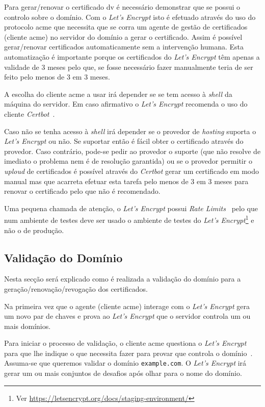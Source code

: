 Para gerar/renovar o certificado \acrshort{dv} é necessário demonstrar que se possui o controlo sobre o domínio. Com o \textit{Let's Encrypt} isto é efetuado através do uso do protocolo \acrfull{acme} que necessita que se corra um agente de gestão de certificados (cliente \acrshort{acme}) no servidor do domínio a gerar o certificado. Assim é possível gerar/renovar certificados automaticamente sem a intervenção humana. Esta automatização é importante porque os certificados do \textit{Let's Encrypt} têm apenas a validade de 3 meses pelo que, se fosse necessário fazer manualmente teria de ser feito pelo menos de 3 em 3 meses.

A escolha do cliente \acrshort{acme} a usar irá depender se se tem acesso à \textit{shell} da máquina do servidor. Em caso afirmativo o \textit{Let's Encrypt} recomenda o uso do cliente \textit{Certbot}~\cite{letEnc}.

Caso não se tenha acesso à \textit{shell} irá depender se o provedor de \textit{hosting} suporta o \textit{Let's Encrypt} ou não. Se suportar então é fácil obter o certificado através do provedor. Caso contrário, pode-se pedir ao provedor o suporte (que não resolve de imediato o problema nem é de resolução garantida) ou se o provedor permitir o \textit{uploud} de certificados é possível através do \textit{Certbot} gerar um certificado em modo manual mas que acarreta efetuar esta tarefa pelo menos de 3 em 3 meses para renovar o certificado pelo que não é recomendado.

Uma pequena chamada de atenção, o \textit{Let's Encrypt} possui \textit{Rate Limits}~\cite{LErateLimits} pelo que num ambiente de testes deve ser usado o ambiente de testes do \textit{Let's Encrypt}\footnote{Ver \url{https://letsencrypt.org/docs/staging-environment/}} e não o de produção.

\subsection{Validação do Domínio}

Nesta secção será explicado como é realizada a validação do domínio para a geração/renovação/revogação dos certificados.

Na primeira vez que o agente (cliente \acrshort{acme}) interage com o \textit{Let's Encrypt} gera um novo par de chaves e prova ao \textit{Let's Encrypt} que o servidor controla um ou mais domínios.~\cite{domainValidation}

Para iniciar o processo de validação, o cliente \acrshort{acme} questiona o \textit{Let's Encrypt} para que lhe indique o que necessita fazer para provar que controla o domínio~\cite{domainValidation}. Assuma-se que queremos validar o domínio \texttt{example.com}.
O \textit{Let's Encrypt} irá gerar um ou mais conjuntos de desafios após olhar para o nome do domínio.

